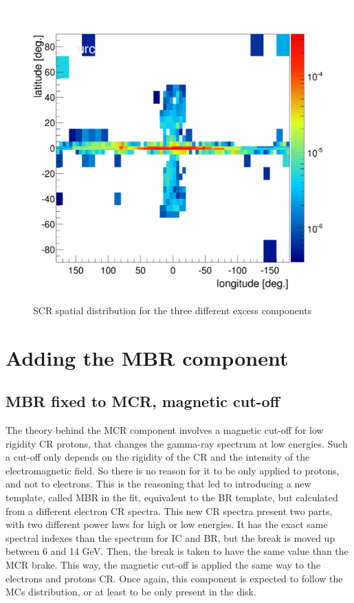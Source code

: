 \begin{figure}[h]
\begin{minipage}[h]{0.3\textwidth}
	  \label{}
  \end{minipage}
  \hfill
  \begin{minipage}[h]{0.3\textwidth}
	  \centering
	  \includegraphics[width=1.\linewidth]{pic/discussion/MSPonly_SCR_integral_flux.png}
	  \label{}
  \end{minipage}
  \caption{SCR spatial distribution for the three different excess components}
  \label{fig:SCR_flux_distrib_excess_comp}	 
\end{figure}


\section{Adding the MBR component}

\subsection{MBR fixed to MCR, magnetic cut-off}

The theory behind the MCR component involves a magnetic cut-off for low rigidity CR protons, that changes the gamma-ray spectrum at low energies. Such a cut-off only depends on the rigidity of the CR and the intensity of the electromagnetic field. So there is no reason for it to be only applied to protons, and not to electrons. This is the reasoning that led to introducing a new template, called MBR in the fit, equivalent to the BR template, but calculated from a different electron CR spectra. This new CR spectra present two parts, with two different power laws for high or low energies. It has the exact same spectral indexes than the spectrum for IC and BR, but the break is moved up between 6 and 14 GeV. Then, the break is taken to have the same value than the MCR brake. This way, the magnetic cut-off is applied the same way to the electrons and protons CR. Once again, this component is expected to follow the MCs distribution, or at least to be only present in the disk.

